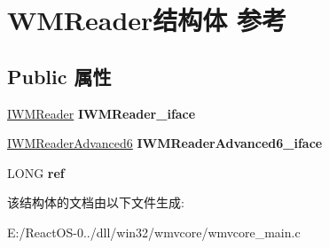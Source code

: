 \hypertarget{struct_w_m_reader}{}\section{W\+M\+Reader结构体 参考}
\label{struct_w_m_reader}
\subsection*{Public 属性}
\begin{DoxyCompactItemize}
\item 
\mbox{\label{struct_w_m_reader_a64bc7d90eec5fd05488c5c05896b466e}} 
\hyperlink{interface_i_w_m_reader}{I\+W\+M\+Reader} {\bfseries I\+W\+M\+Reader\+\_\+iface}
\item 
\mbox{\label{struct_w_m_reader_a1663d72bbf11b4a74b6c5ae8a0a6fd80}} 
\hyperlink{interface_i_w_m_reader_advanced6}{I\+W\+M\+Reader\+Advanced6} {\bfseries I\+W\+M\+Reader\+Advanced6\+\_\+iface}
\item 
\mbox{\label{struct_w_m_reader_a8c2b73683759533880bdceac846ec57a}} 
L\+O\+NG {\bfseries ref}
\end{DoxyCompactItemize}


该结构体的文档由以下文件生成\+:\begin{DoxyCompactItemize}
\item 
E\+:/\+React\+O\+S-\/0../dll/win32/wmvcore/wmvcore\+\_\+main.\+c\end{DoxyCompactItemize}
